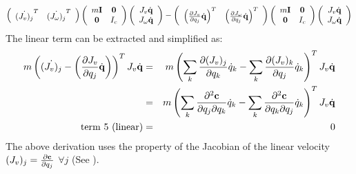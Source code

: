 \begin{eqnarray}
\label{eq:term5}
\left (
\begin{array}{cc}
\dot{(J_v)_j}^T & \dot{(J_\omega)_j}^T
\end{array} 
\right )
\left(
\begin{array}{cc}
m\mathbf{I} & \mathbf{0} \\
\mathbf{0} & I_c
\end{array}
\right)
\left (
\begin{array}{cc}
J_v \dot{\mathbf{q}} \\
J_\omega \dot{\mathbf{q}}
\end{array} 
\right )
-
\left (
\begin{array}{cc}
\left(\frac{\partial J_v}{\partial q_j}\dot{\mathbf{q}}\right)^T & \left(\frac{\partial J_\omega}{\partial q_j}\dot{\mathbf{q}}\right)^T
\end{array} 
\right )
\left(
\begin{array}{cc}
m\mathbf{I} & \mathbf{0} \\
\mathbf{0} & I_c
\end{array}
\right)
\left (
\begin{array}{cc}
J_v \dot{\mathbf{q}} \\
J_\omega \dot{\mathbf{q}}
\end{array} 
\right )
\end{eqnarray}
The linear term can be extracted and simplified as:
\begin{eqnarray}
\label{eq:term5_lin}
\nonumber
m\left( \dot{(J_v)_j}  - \left(\frac{\partial J_v}{\partial q_j}\dot{\mathbf{q}}\right) \right )^T J_v \dot{\mathbf{q}} & = & m\left( \sum_k \frac{\partial (J_v)_j}{\partial q_k}\dot{q}_k -  \sum_k \frac{\partial (J_v)_k}{\partial q_j} \dot{q}_k \right )^T J_v \dot{\mathbf{q}}\\
\nonumber
& = & m\left( \sum_k \frac{\partial^2 \mathbf{c}}{\partial q_j \partial q_k}\dot{q}_k -  \sum_k \frac{\partial^2 \mathbf{c}}{\partial q_k \partial q_j} \dot{q}_k \right )^T J_v \dot{\mathbf{q}} \\
\mbox{term 5 (linear)} & = & 0
\end{eqnarray}
The above derivation uses the property of the Jacobian of the linear velocity  $(J_v)_j = \frac{\partial \mathbf{c}}{\partial q_j}$ $\forall j$ (See ).

